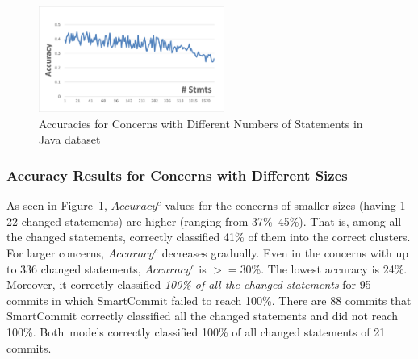 \begin{figure}[t]
	\centering \includegraphics[width=2.4in]{figures/accuracy-concerns-java.png}
	\vspace{-6pt}
	\caption{Accuracies for Concerns with Different Numbers of Statements in Java dataset}
	\label{RQ2-result-3}
\end{figure}






\subsubsection{Accuracy Results for Concerns with Different Sizes}

As seen in Figure~\ref{RQ2-result-3}, $Accuracy^{c}$ values for the
concerns of smaller sizes (having 1--22 changed statements) are higher
(ranging from 37\%--45\%). That is, among all the changed statements,
{\tool} correctly classified 41\% of them into the correct clusters.
For larger concerns, $Accuracy^{c}$ decreases gradually. Even in the
concerns with up to 336 changed statements, $Accuracy^{c}$ is
$>=$30\%. The lowest accuracy is 24\%. Moreover, it
correctly classified {\em 100\% of all the changed statements} for 95
commits in which SmartCommit failed to reach 100\%. There are 88
commits that SmartCommit correctly classified all the changed
statements and {\tool} did not reach 100\%. Both~models correctly
classified 100\% of all changed statements of 21 commits.

